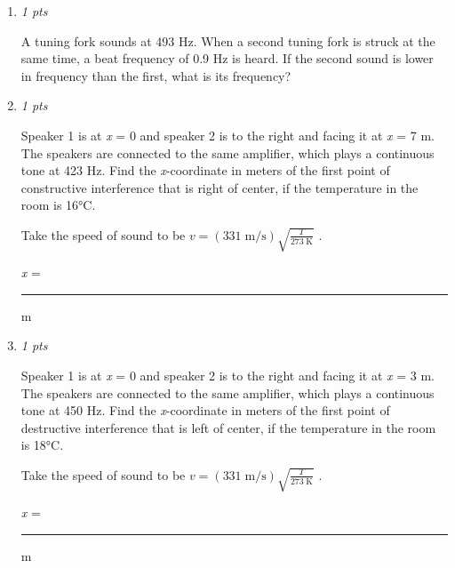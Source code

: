 \documentclass[11pt]{article}
\begin{document}
\begin{enumerate}[leftmargin=*,label=\textbf{Question \arabic*.}]
\item \hfill \textit{1 pts}

A tuning fork sounds at 493 Hz. When a second tuning fork is struck at the same time, a beat frequency of 0.9 Hz is heard. If the second sound is lower in frequency than the first, what is its frequency?

\item \hfill \textit{1 pts}

Speaker 1 is at \emph{x} = 0 and speaker 2 is to the right and facing it at \emph{x} = 7 m. The speakers are connected to the same amplifier, which plays a continuous tone at 423 Hz. Find the \emph{x}-coordinate in meters of the first point of constructive interference that is right of center, if the temperature in the room is 16°C.

Take the speed of sound to be $v=(331\;\mathrm{m/s})\sqrt{\frac{T}{273\;\mathrm{K}}}$ .



\emph{x} = \rule{2cm}{0.4pt} m

\item \hfill \textit{1 pts}

Speaker 1 is at \emph{x} = 0 and speaker 2 is to the right and facing it at \emph{x} = 3 m. The speakers are connected to the same amplifier, which plays a continuous tone at 450 Hz. Find the \emph{x}-coordinate in meters of the first point of destructive interference that is left of center, if the temperature in the room is 18°C.



Take the speed of sound to be $v=(331\;\mathrm{m/s})\sqrt{\frac{T}{273\;\mathrm{K}}}$ .



\emph{x} = \rule{2cm}{0.4pt} m

\end{enumerate}
\end{document}
